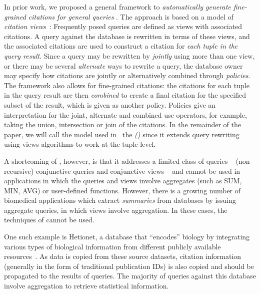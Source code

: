 In prior work, we proposed a general framework to {\em automatically generate fine-grained citations for general queries} \cite{alawini2017automating,wu2018data}.
The approach is based on a model of {\em citation views}~\cite{BunemanEtAl2016,davidson2017model,DBLP:conf/pods/DavidsonBDMS17}: Frequently posed queries  are defined as views with associated citations. A query against the database is rewritten in terms of these views, and the associated citations are used to construct a citation for \textit{each tuple in the query result}. Since a query may be rewritten by \textit{jointly} using more than one view, or there may be several \textit{alternate} ways to rewrite a query, the database owner may specify how citations are jointly or alternatively combined through \textit{policies}.  The framework also allows for fine-grained citations: the citations for each tuple in the query result are then \textit{combined} to create a final citation for the specified subset of the result, which is given as another policy.  Policies give an interpretation for the joint, alternate and combined use operators, for example, taking the union, intersection or join of the citations.  In the remainder of the paper, we will call the model used in~\cite{wu2018data} the {\em {\rbafull} (\rba)} since it  extends query rewriting using views algorithms to work at the tuple level.

A shortcoming of {\rba}, however, is that it addresses a limited class of queries -- (non-recursive) conjunctive queries and conjunctive views -- and cannot be used in applications in which the queries and views involve aggregates (such as SUM, MIN, AVG) or user-defined functions.  However, there is a growing number of biomedical applications which extract \textit{summaries} from data\-bases by issuing aggregate queries, in which views involve aggregation. In these cases, the techniques of \cite{wu2018data} cannot be used.


One such example is Hetionet, a database that ``encodes'' biology by integrating various types of biological information from different publicly available resources~\cite{himmelstein2015heterogeneous, himmelstein2017systematic}.
As data is copied from these source datasets, citation information (generally in the form of traditional publication IDs) is also copied and should be propagated to the results of queries.
The majority of queries against this database involve aggregation to retrieve statistical information.

